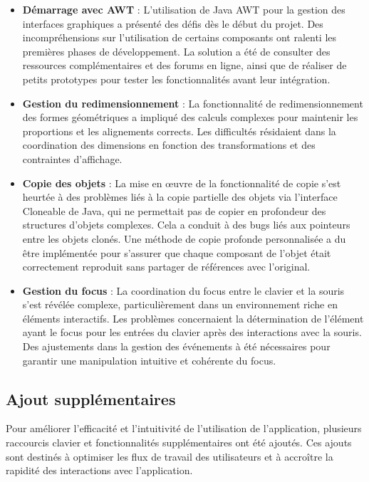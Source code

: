 \documentclass[a4paper,11pt]{article}
\begin{document}
\begin{itemize}
    \item \textbf{Démarrage avec AWT} : L'utilisation de Java AWT pour la gestion des interfaces graphiques a présenté des défis dès le début du projet. Des incompréhensions sur l'utilisation de certains composants ont ralenti les premières phases de développement. La solution a été de consulter des ressources complémentaires et des forums en ligne, ainsi que de réaliser de petits prototypes pour tester les fonctionnalités avant leur intégration.

    \item \textbf{Gestion du redimensionnement} : La fonctionnalité de redimensionnement des formes géométriques a impliqué des calculs complexes pour maintenir les proportions et les alignements corrects. Les difficultés résidaient dans la coordination des dimensions en fonction des transformations et des contraintes d'affichage.

    \item \textbf{Copie des objets} : La mise en œuvre de la fonctionnalité de copie s'est heurtée à des problèmes liés à la copie partielle des objets via l'interface Cloneable de Java, qui ne permettait pas de copier en profondeur des structures d'objets complexes. Cela a conduit à des bugs liés aux pointeurs entre les objets clonés. Une méthode de copie profonde personnalisée a du être implémentée pour s'assurer que chaque composant de l'objet était correctement reproduit sans partager de références avec l'original.

    \item \textbf{Gestion du focus} : La coordination du focus entre le clavier et la souris s'est révélée complexe, particulièrement dans un environnement riche en éléments interactifs. Les problèmes concernaient la détermination de l'élément ayant le focus pour les entrées du clavier après des interactions avec la souris. Des ajustements dans la gestion des événements à été nécessaires pour garantir une manipulation intuitive et cohérente du focus.
\end{itemize}


\subsection{Ajout supplémentaires}

Pour améliorer l'efficacité et l'intuitivité de l'utilisation de l'application, plusieurs raccourcis clavier et fonctionnalités supplémentaires ont été ajoutés. Ces ajouts sont destinés à optimiser les flux de travail des utilisateurs et à accroître la rapidité des interactions avec l'application.
\end{document}
